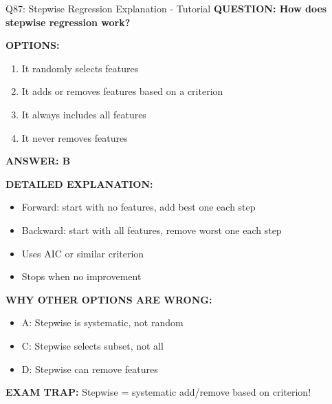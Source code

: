 \documentclass[8pt]{beamer}
\begin{document}
	\begin{frame}{Q87: Stepwise Regression Explanation - Tutorial}
		\fontsize{6.5}{7.5}\selectfont
		\textbf{QUESTION: How does stepwise regression work?}
		
		\vspace{0.1cm}
		\textbf{OPTIONS:}
		\begin{enumerate}
			\item It randomly selects features
			\item It adds or removes features based on a criterion
			\item It always includes all features
			\item It never removes features
		\end{enumerate}
		
		\vspace{0.1cm}
		\textcolor{myblue}{\textbf{ANSWER: B}}
		
		\vspace{0.1cm}
		\textbf{DETAILED EXPLANATION:}
		\begin{itemize}
			\item Forward: start with no features, add best one each step
			\item Backward: start with all features, remove worst one each step
			\item Uses AIC or similar criterion
			\item Stops when no improvement
		\end{itemize}
		
		\vspace{0.1cm}
		\textcolor{myred}{\textbf{WHY OTHER OPTIONS ARE WRONG:}}
		\begin{itemize}
			\item \textcolor{myred}{A:} Stepwise is systematic, not random
			\item \textcolor{myred}{C:} Stepwise selects subset, not all
			\item \textcolor{myred}{D:} Stepwise can remove features
		\end{itemize}
		
		\textcolor{myred}{\textbf{EXAM TRAP:}} Stepwise = \textcolor{myblue}{systematic add/remove based on criterion}!
	\end{frame}
	
\end{document}
